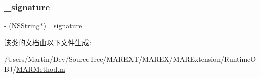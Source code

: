 \subsubsection{\texorpdfstring{\+\_\+signature}{\_signature}}
{\footnotesize\ttfamily -\/ (N\+S\+String$\ast$) \+\_\+signature\hspace{0.3cm}{\ttfamily [protected]}}



该类的文档由以下文件生成\+:\begin{DoxyCompactItemize}
\item 
/\+Users/\+Martin/\+Dev/\+Source\+Tree/\+M\+A\+R\+E\+X\+T/\+M\+A\+R\+E\+X/\+M\+A\+R\+Extension/\+Runtime\+O\+B\+J/\hyperlink{_m_a_r_method_8m}{M\+A\+R\+Method.\+m}\end{DoxyCompactItemize}
